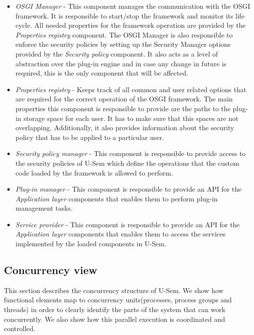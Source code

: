 \begin{itemize}

\item \textit{OSGI Manager} - This component manages the communication with the OSGI framework. It is responsible to start/stop the framework and monitor its life cycle. All needed properties for the framework operation are provided by the \textit{Properties registry} component. The OSGI Manager is also responsible to enforce the security policies by setting up the Security Manager options provided by the \textit{Security policy} component. It also acts as a level of abstraction over the plug-in engine and in case any change in future is required, this is the only component that will be affected. 

\item \textit{Properties registry} - Keeps track of all common and user related options that are required for the correct operation of the OSGI framework. The main properties this component is responsible to provide are the paths to the plug-in storage space for each user. It has to make sure that this spaces are not overlapping. Additionally, it also provides information about the security policy that has to be applied to a particular user. 

\item \textit{Security policy manager} - This component is responsible to provide access to the security policies of U-Sem which define the operations that the custom code loaded by the framework is allowed to perform.

\item \textit{Plug-in manager} - This component is responsible to provide an API for the \textit{Application layer} components that enables them to perform plug-in management tasks.

\item \textit{Service provider} - This component is responsible to provide an API for the \textit{Application layer} components that enables them to access the services implemented by the loaded components in U-Sem.

\end{itemize}

\subsection{Concurrency view}

This section describes the concurrency structure of U-Sem. We show how functional elements map to concurrency units(processes, process groups and threads) in order to clearly identify the parts of the system that can work concurrently. We also show how this parallel execution is coordinated and controlled.

